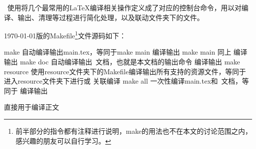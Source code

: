 \dk~使用将几个最常用的{\LaTeX}编译相关操作定义成了对应的控制台命令，用以对编译、输出、清理等过程进行简化处理，以及联动文件夹下的文件。

{\today}版的Makefile\footnote{前半部分的指令都有注释进行说明，make的用法也不在本文的讨论范围之内，感兴趣的朋友可以自行学习。}文件源码如下：


\begin{cvhonors}[LLR]
  \cvhonor
  {make}
  {自动编译输出main.tex，等同于make main}
  {编译输出}
  \cvhonor
  {make main}
  {同上}
  {编译输出}
  \cvhonor
  {make doc}
  {自动编译输出\dk~文档，也就是本文档的输出命令}
  {编译输出}
  \cvhonor
  {make resource}
  {使用resource文件夹下的Makefile编译输出所有支持的资源文件，等同于进入resource文件夹下进行或}
  {关联编译}
  \cvhonor
  {make all}
  {一次性编译main.tex和\dk~文档，等同于}
  {编译输出}
\end{cvhonors}

直接用于编译正文

\clearpage
